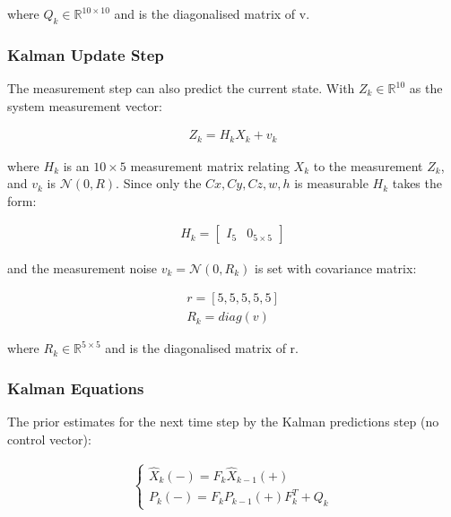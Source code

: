 \documentclass[a4paper,11pt,notitlepage]{article}
\begin{document}
where $Q_{k} \in \mathbb{R}^{10 \times 10}$ and is the diagonalised matrix of v. 

\subsubsection{Kalman Update Step}

The measurement step can also predict the current state. With $Z_{k} \in \mathbb{R}^{10}$ as the system measurement vector:

\begin{equation}
\begin{aligned}
Z_{k} =  H_{k} X_{k} + v_{k}
\end{aligned}
\end{equation}

where $H_{k}$ is an $10 \times 5$ measurement matrix relating $X_{k}$ to the measurement $Z_{k}$, and $v_{k}$ is $\mathcal{N}(0,R)$. Since only the $Cx,Cy,Cz,w,h$ is measurable $H_{k}$ takes the form:



\begin{equation}
\begin{aligned}
H_{k} = 
\begin{bmatrix}
I_{5} &  0_{5 \times 5}
\end{bmatrix}
\end{aligned}
\end{equation}

and the measurement noise $v_{k} = \mathcal{N}(0,R_{k})$ is set with covariance matrix:

\begin{equation}
\begin{aligned}
r = [5,5,5,5,5] \\
R_{k} = diag(v)
\end{aligned}
\end{equation}

where $R_{k} \in \mathbb{R}^{5 \times 5}$ and is the diagonalised matrix of r. 

\subsubsection{Kalman Equations}
The prior estimates for the next time step by the Kalman predictions step (no control vector):

\begin{equation}
\label{Kalman_pred_eq}
\begin{aligned}
\begin{cases}
\hat{X}_{k}(-) =  F_{k} \hat{X}_{k-1}(+)\\
P_{k}(-) = F_{k} P_{k-1}(+) F_{k}^{T} + Q_{k}
\end{cases}
\end{aligned}
\end{equation}
\end{document}
